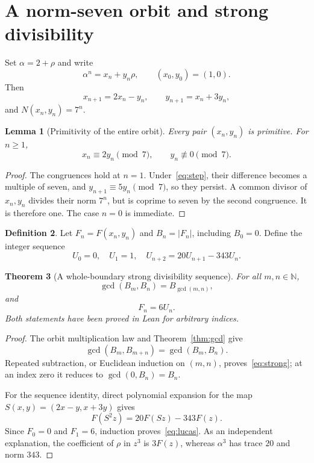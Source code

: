 \documentclass[11pt]{article}
\newtheorem{theorem}{Theorem}[section]
\newtheorem{lemma}[theorem]{Lemma}
\theoremstyle{definition}
\newtheorem{definition}[theorem]{Definition}
\theoremstyle{remark}
\newcommand{\NN}{\mathbb N}
\begin{document}
\section{A norm-seven orbit and strong divisibility}
Set $\alpha=2+\rho$ and write
\begin{equation}\label{eq:orbit}
\alpha^n=x_n+y_n\rho,\qquad (x_0,y_0)=(1,0).
\end{equation}
Then
\begin{equation}\label{eq:step}
x_{n+1}=2x_n-y_n,\qquad y_{n+1}=x_n+3y_n,
\end{equation}
and $N(x_n,y_n)=7^n$.

\begin{lemma}[Primitivity of the entire orbit]\label{lem:primitive}
Every pair $(x_n,y_n)$ is primitive. For $n\ge1$,
\[
x_n\equiv2y_n\pmod7,\qquad y_n\not\equiv0\pmod7.
\]
\end{lemma}
\begin{proof}
The congruences hold at $n=1$. Under~\eqref{eq:step}, their difference becomes a multiple of seven, and $y_{n+1}\equiv5y_n\pmod7$, so they persist. A common divisor of $x_n,y_n$ divides their norm $7^n$, but is coprime to seven by the second congruence. It is therefore one. The case $n=0$ is immediate.
\end{proof}

\begin{definition}
Let $F_n=F(x_n,y_n)$ and $B_n=|F_n|$, including $B_0=0$. Define the integer sequence
\[
U_0=0,\quad U_1=1,\quad U_{n+2}=20U_{n+1}-343U_n.
\]
\end{definition}

\begin{theorem}[A whole-boundary strong divisibility sequence]\label{thm:strong}
For all $m,n\in\NN$,
\begin{equation}\label{eq:strong}
\gcd(B_m,B_n)=B_{\gcd(m,n)},
\end{equation}
and
\begin{equation}\label{eq:lucas}
F_n=6U_n.
\end{equation}
Both statements have been proved in Lean for arbitrary indices.
\end{theorem}
\begin{proof}
The orbit multiplication law and Theorem~\ref{thm:gcd} give
\[
\gcd(B_m,B_{m+n})=\gcd(B_m,B_n).
\]
Repeated subtraction, or Euclidean induction on $(m,n)$, proves~\eqref{eq:strong}; at an index zero it reduces to $\gcd(0,B_n)=B_n$.

For the sequence identity, direct polynomial expansion for the map $S(x,y)=(2x-y,x+3y)$ gives
\[
F(S^2z)=20F(Sz)-343F(z).
\]
Since $F_0=0$ and $F_1=6$, induction proves~\eqref{eq:lucas}. As an independent explanation, the coefficient of $\rho$ in $z^3$ is $3F(z)$, whereas $\alpha^3$ has trace $20$ and norm $343$.
\end{proof}
\end{document}

